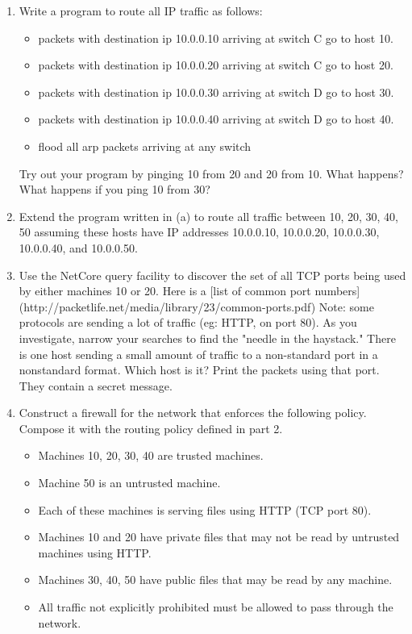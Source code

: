 \documentclass{article}
\begin{document}
\noindent
\begin{enumerate}
\item Write a program to route all IP traffic as follows: 
\begin{itemize}
  \item packets with destination ip 10.0.0.10 arriving at switch C go to host 10.  
  \item packets with destination ip 10.0.0.20 arriving at switch C go to host 20.  
  \item packets with destination ip 10.0.0.30 arriving at switch D go to host 30.  
  \item packets with destination ip 10.0.0.40 arriving at switch D go to host 40.  
  \item flood all arp packets arriving at any switch
\end{itemize}
Try out your program by pinging 10 from 20 and 20 from 10.  What happens?
What happens if you ping 10 from 30?

\item
Extend the program written in (a) to route all traffic between
10, 20, 30, 40, 50 assuming these hosts have IP addresses 
10.0.0.10, 10.0.0.20, 10.0.0.30, 10.0.0.40, and 10.0.0.50.

\item Use the NetCore query facility to discover the set of all TCP ports 
being used by either machines 10 or 20.  Here is a [list of common port
numbers](http://packetlife.net/media/library/23/common-ports.pdf)
Note: some protocols are sending a lot of traffic (eg: HTTP, on port
80).  As you investigate, narrow your searches to find the "needle in
the haystack."  There is one host sending a small amount of traffic to
a non-standard port in a nonstandard format.  Which host is it?  Print
the packets using that port.  They contain a secret message.

\item Construct a firewall for the network that enforces the following policy.
Compose it with the routing policy defined in part 2.
\begin{itemize}
  \item Machines 10, 20, 30, 40 are trusted machines.  
  \item Machine 50 is an untrusted machine.  
  \item Each of these machines is serving files using HTTP (TCP port 80).  
  \item Machines 10 and 20 have private files that may not be read by untrusted machines using HTTP.  
  \item Machines 30, 40, 50 have public files that may be read by any machine.
  \item All traffic not explicitly prohibited must be allowed to pass through the network.
\end{itemize}
\end{enumerate}
\end{document}
